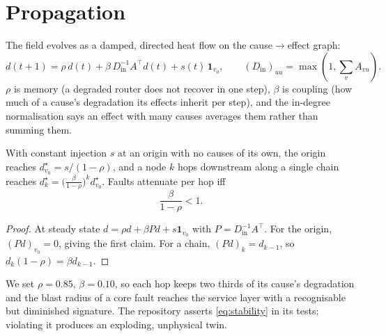 \section{Propagation}
The field evolves as a damped, directed heat flow on the cause$\to$effect graph:
\begin{equation}
d(t+1)=\rho\,d(t)+\beta\,D_{\mathrm{in}}^{-1}A^{\top}d(t)+s(t)\,\mathbf{1}_{v_0},
\qquad (D_{\mathrm{in}})_{uu}=\max(1,\textstyle\sum_v A_{vu}).
\label{eq:propagation}
\end{equation}
$\rho$ is memory (a degraded router does not recover in one step), $\beta$ is coupling (how much of
a cause's degradation its effects inherit per step), and the in-degree normalisation says an
effect with many causes averages them rather than summing them.

\begin{proposition}
With constant injection $s$ at an origin with no causes of its own, the origin reaches
$d_{v_0}^{\star}=s/(1-\rho)$, and a node $k$ hops downstream along a single chain reaches
$d^{\star}_{k}=\big(\tfrac{\beta}{1-\rho}\big)^{k}d^{\star}_{v_0}$.
Faults attenuate per hop iff
\begin{equation}
\frac{\beta}{1-\rho}<1.
\label{eq:stability}
\end{equation}
\end{proposition}
\begin{proof}
At steady state $d=\rho d+\beta P d+s\mathbf 1_{v_0}$ with $P=D_{\mathrm{in}}^{-1}A^\top$. For the
origin, $(Pd)_{v_0}=0$, giving the first claim. For a chain, $(Pd)_k=d_{k-1}$, so
$d_k(1-\rho)=\beta d_{k-1}$.
\end{proof}

We set $\rho=0.85$, $\beta=0.10$, so each hop keeps two thirds of its cause's degradation and the
blast radius of a core fault reaches the service layer with a recognisable but diminished signature.
The repository asserts \eqref{eq:stability} in its tests; violating it produces an exploding,
unphysical twin.

